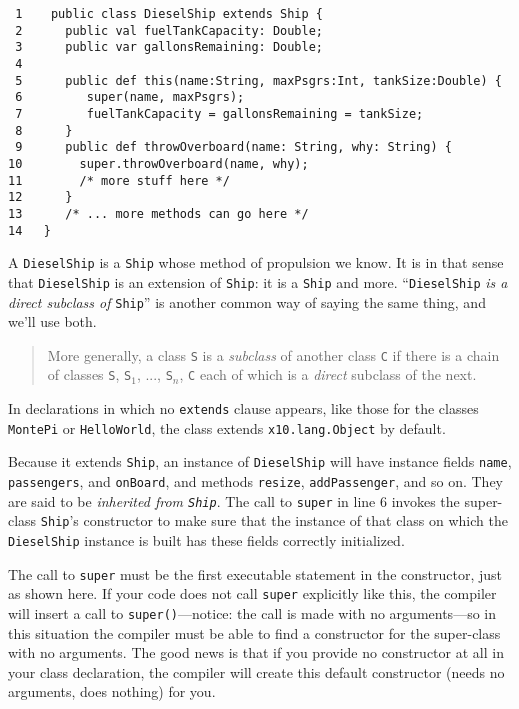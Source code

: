 \begin{verbatim}
 1    public class DieselShip extends Ship {
 2      public val fuelTankCapacity: Double; 
 3      public var gallonsRemaining: Double;
 4      
 5      public def this(name:String, maxPsgrs:Int, tankSize:Double) {
 6         super(name, maxPsgrs);
 7         fuelTankCapacity = gallonsRemaining = tankSize;
 8      }
 9      public def throwOverboard(name: String, why: String) {
10        super.throwOverboard(name, why);
11        /* more stuff here */
12      }
13      /* ... more methods can go here */
14   }
\end{verbatim}

A {\tt DieselShip} is a {\tt Ship} whose method of propulsion we know.  It is
in that sense that {\tt DieselShip} is an extension of {\tt Ship}: it is a
{\tt Ship} and more.  ``{\tt DieselShip} {\em is a direct
subclass of} {\tt Ship}'' is another common way of saying the same thing,
and we'll use both.
 \begin{quote}
More generally, a class {\tt S} is a {\em subclass} of another class {\tt C} if
there is a chain of classes {\tt S}, {\tt S$_{1}$}, ..., {\tt S$_{n}$}, {\tt C}
each of which is a {\em direct} subclass of the next.
\end{quote}
In declarations in which no {\tt extends}
clause appears, like those for the classes {\tt MontePi} or {\tt HelloWorld}, 
the class extends {\tt x10.lang.Object} by default.

Because it extends {\tt Ship}, an instance of {\tt DieselShip} will have
instance fields {\tt name}, {\tt passengers}, and {\tt on\-Board}, and methods
{\tt resize}, {\tt add\-Pas\-sen\-ger}, and so on.  They are said to be {\em
inherited from {\tt Ship}}.  The call to {\tt super} in line 6 invokes the
super-class {\tt Ship}'s constructor to make sure that the instance of that
class on which the {\tt DieselShip} instance is built has these fields correctly
initialized. 

The call to {\tt super} must be the first executable statement in the
constructor, just as shown here.  If your code does not call {\tt super}
explicitly like this, the compiler will insert a call to {\tt super()}---notice:
the call is made with no arguments---so in this situation the compiler must be able to
find a constructor for the super-class with no arguments. The good news is that
if you provide no constructor at all in your class declaration, the compiler will
create this default constructor (needs no arguments, does nothing) for you.

